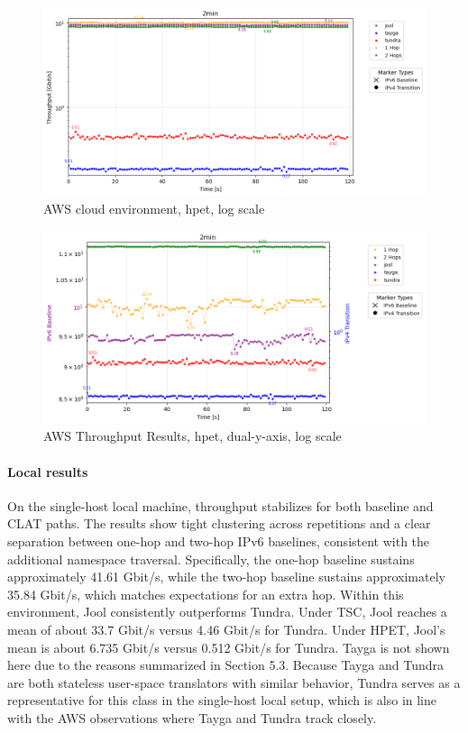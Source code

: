 \begin{figure}[H]
    \centering
    \includegraphics[width=1\textwidth]{resources/finalPlots/combinedplots/AWS_tcp_sameScale_hpet_2min_log.png}
    \caption{AWS cloud environment, hpet, log scale}
    \label{fig:AWS_tcp_sameScale_hpet_log}

\end{figure}


\begin{figure}[H]
    \centering
    \includegraphics[width=1\textwidth]{resources/finalPlots/Jitterplots/AWS_tcp_dualAxis_hpet_2min_log.png}
    \caption{AWS Throughput Results, hpet, dual-y-axis, log scale}
    \label{fig:AWS_tcp_dualAxis_hpet_log}
\end{figure}



\paragraph{Local results}

On the single-host local machine, throughput stabilizes for both baseline and CLAT paths. The results show tight clustering across repetitions and a clear separation between one-hop and two-hop IPv6 baselines, consistent with the additional namespace traversal. Specifically, the one-hop baseline sustains approximately 41.61 Gbit/s, while the two-hop baseline sustains approximately 35.84 Gbit/s, which matches expectations for an extra hop. Within this environment, Jool consistently outperforms Tundra. Under TSC, Jool reaches a mean of about 33.7 Gbit/s versus 4.46 Gbit/s for Tundra. Under HPET, Jool's mean is about 6.735 Gbit/s versus 0.512 Gbit/s for Tundra. Tayga is not shown here due to the reasons summarized in Section 5.3. Because Tayga and Tundra are both stateless user-space translators with similar behavior, Tundra serves as a representative for this class in the single-host local setup, which is also in line with the AWS observations where Tayga and Tundra track closely.

